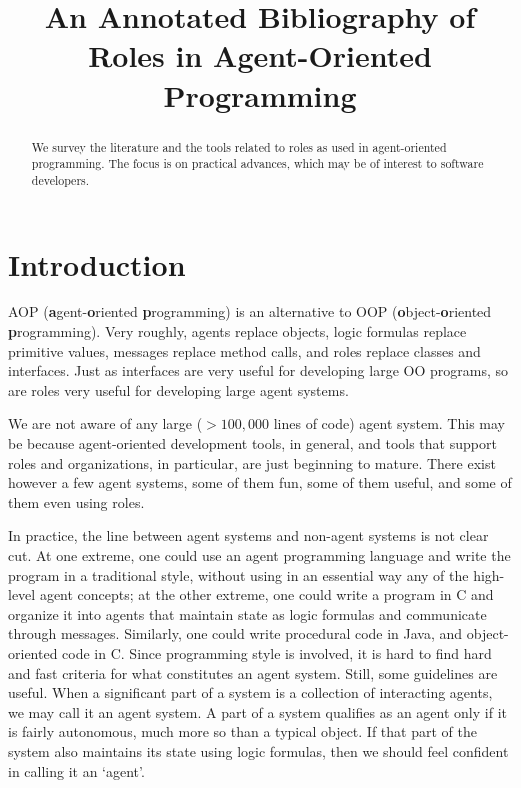\documentclass{article}
\title{An Annotated Bibliography of Roles in Agent-Oriented Programming}
\newcommand{\fb}[1]{\textbf{#1}}
\begin{document}
\maketitle

\begin{abstract}
We survey the literature and the tools related to roles as used in agent-oriented programming.
The focus is on practical advances, which may be of interest to software developers.
\end{abstract}

\section{Introduction}\label{sec:introduction} %

AOP (\fb agent-\fb oriented \fb programming) is an alternative to OOP (\fb object-\fb oriented \fb programming).
Very roughly, agents replace objects, logic formulas replace primitive values, messages replace method calls, and roles replace classes and interfaces.
Just as interfaces are very useful for developing large OO programs, so are roles very useful for developing large agent systems.

We are not aware of any large ($>100{,}000$ lines of code) agent system.
This may be because agent-oriented development tools, in general, and tools that support roles and organizations, in particular, are just beginning to mature.
There exist however a few agent systems, some of them fun, some of them useful, and some of them even using roles.

In practice, the line between agent systems and non-agent systems is not clear cut.
At one extreme, one could use an agent programming language and write the program in a traditional style, without using in an essential way any of the high-level agent concepts; at the other extreme, one could write a program in C and organize it into agents that maintain state as logic formulas and communicate through messages.
Similarly, one could write procedural code in Java, and object-oriented code in C\null.
Since programming style is involved, it is hard to find hard and fast criteria for what constitutes an agent system.
Still, some guidelines are useful.
When a significant part of a system is a collection of interacting agents, we may call it an agent system.
A part of a system qualifies as an agent only if it is fairly autonomous, much more so than a typical object.
If that part of the system also maintains its state using logic formulas, then we should feel confident in calling it an `agent'.
\end{document}
